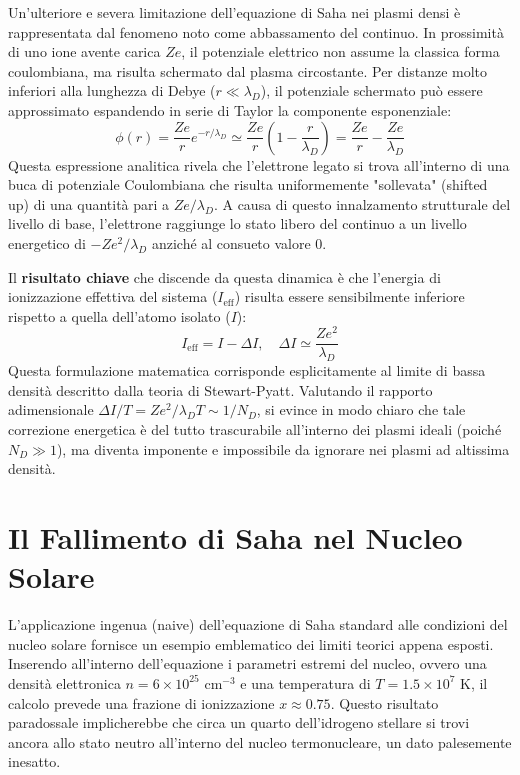 Un'ulteriore e severa limitazione dell'equazione di Saha nei plasmi densi è rappresentata dal fenomeno noto come abbassamento del continuo. In prossimità di uno ione avente carica $Ze$, il potenziale elettrico non assume la classica forma coulombiana, ma risulta schermato dal plasma circostante. Per distanze molto inferiori alla lunghezza di Debye ($r \ll \lambda_D$), il potenziale schermato può essere approssimato espandendo in serie di Taylor la componente esponenziale:
\begin{equation}
\phi(r) = \frac{Ze}{r} e^{-r/\lambda_D} \simeq \frac{Ze}{r} \left( 1 - \frac{r}{\lambda_D} \right) = \frac{Ze}{r} - \frac{Ze}{\lambda_D}
\end{equation}
Questa espressione analitica rivela che l'elettrone legato si trova all'interno di una buca di potenziale Coulombiana che risulta uniformemente "sollevata" (shifted up) di una quantità pari a $Ze/\lambda_D$. A causa di questo innalzamento strutturale del livello di base, l'elettrone raggiunge lo stato libero del continuo a un livello energetico di $-Ze^2/\lambda_D$ anziché al consueto valore $0$.

Il \textbf{risultato chiave} che discende da questa dinamica è che l'energia di ionizzazione effettiva del sistema ($I_{\text{eff}}$) risulta essere sensibilmente inferiore rispetto a quella dell'atomo isolato ($I$):
\begin{equation}
I_{\text{eff}} = I - \Delta I, \quad \Delta I \simeq \frac{Ze^2}{\lambda_D}
\end{equation}
Questa formulazione matematica corrisponde esplicitamente al limite di bassa densità descritto dalla teoria di Stewart-Pyatt. Valutando il rapporto adimensionale $\Delta I / T = Z e^2 / \lambda_D T \sim 1/N_D$, si evince in modo chiaro che tale correzione energetica è del tutto trascurabile all'interno dei plasmi ideali (poiché $N_D \gg 1$), ma diventa imponente e impossibile da ignorare nei plasmi ad altissima densità.

\section{Il Fallimento di Saha nel Nucleo Solare}

L'applicazione ingenua (naive) dell'equazione di Saha standard alle condizioni del nucleo solare fornisce un esempio emblematico dei limiti teorici appena esposti. Inserendo all'interno dell'equazione i parametri estremi del nucleo, ovvero una densità elettronica $n = 6 \times 10^{25} \text{ cm}^{-3}$ e una temperatura di $T = 1.5 \times 10^7 \text{ K}$, il calcolo prevede una frazione di ionizzazione $x \approx 0.75$. Questo risultato paradossale implicherebbe che circa un quarto dell'idrogeno stellare si trovi ancora allo stato neutro all'interno del nucleo termonucleare, un dato palesemente inesatto.


